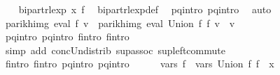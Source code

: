 \begin{isabellebody}
\ \ \isamarkupfalse%
\ {\isachardoublequoteopen}bipart{\isacharunderscore}{\kern0pt}rlexp\ x\ {\isacharquery}{\kern0pt}f{\isacharprime}{\kern0pt}{\isachardoublequoteclose}\ \isamarkupfalse%
\ bipart{\isacharunderscore}{\kern0pt}rlexp{\isacharunderscore}{\kern0pt}def\ \isamarkupfalse%
\ p{}{\isacharunderscore}{\kern0pt}q{}{\isacharunderscore}{\kern0pt}intro\ p{}{\isacharunderscore}{\kern0pt}q{}{\isacharunderscore}{\kern0pt}intro\ \isamarkupfalse%
\ auto\isanewline
\ \ \isamarkupfalse%
\ \isamarkupfalse%
\ {\isachardoublequoteopen}parikh{\isacharunderscore}{\kern0pt}img\ {\isacharparenleft}{\kern0pt}eval\ {\isacharquery}{\kern0pt}f{\isacharprime}{\kern0pt}\ v{\isacharparenright}{\kern0pt}\ {\isacharequal}{\kern0pt}\ parikh{\isacharunderscore}{\kern0pt}img\ {\isacharparenleft}{\kern0pt}eval\ {\isacharparenleft}{\kern0pt}Union\ f{}\ f{}{\isacharparenright}{\kern0pt}\ v{\isacharparenright}{\kern0pt}{\isachardoublequoteclose}\ \ v\isanewline
\ \ \ \ \isamarkupfalse%
\ p{}{\isacharunderscore}{\kern0pt}q{}{\isacharunderscore}{\kern0pt}intro\ p{}{\isacharunderscore}{\kern0pt}q{}{\isacharunderscore}{\kern0pt}intro\ f{}{\isacharprime}{\kern0pt}{\isacharunderscore}{\kern0pt}intro\ f{}{\isacharprime}{\kern0pt}{\isacharunderscore}{\kern0pt}intro\isanewline
\ \ \ \ \isamarkupfalse%
\ {\isacharparenleft}{\kern0pt}simp\ add{\isacharcolon}{\kern0pt}\ conc{\isacharunderscore}{\kern0pt}Un{\isacharunderscore}{\kern0pt}distrib{\isacharparenleft}{\kern0pt}{}{\isacharparenright}{\kern0pt}\ sup{\isacharunderscore}{\kern0pt}assoc\ sup{\isacharunderscore}{\kern0pt}left{\isacharunderscore}{\kern0pt}commute{\isacharparenright}{\kern0pt}\isanewline
\ \ \isamarkupfalse%
\ \isamarkupfalse%
\ f{}{\isacharprime}{\kern0pt}{\isacharunderscore}{\kern0pt}intro\ f{}{\isacharprime}{\kern0pt}{\isacharunderscore}{\kern0pt}intro\ p{}{\isacharunderscore}{\kern0pt}q{}{\isacharunderscore}{\kern0pt}intro\ p{}{\isacharunderscore}{\kern0pt}q{}{\isacharunderscore}{\kern0pt}intro\isanewline
\ \ \ \ \isamarkupfalse%
\ {\isachardoublequoteopen}vars\ {\isacharquery}{\kern0pt}f{\isacharprime}{\kern0pt}\ {\isacharequal}{\kern0pt}\ vars\ {\isacharparenleft}{\kern0pt}Union\ f{}\ f{}{\isacharparenright}{\kern0pt}\ {\isasymunion}\ {\isacharbraceleft}{\kern0pt}x{\isacharbraceright}{\kern0pt}{\isachardoublequoteclose}\ \isamarkupfalse%

\end{isabellebody}
